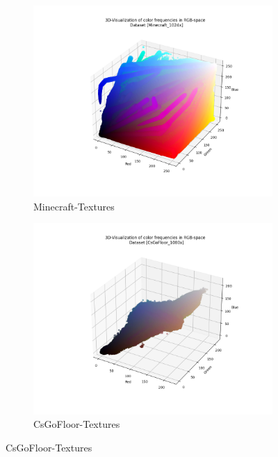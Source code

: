 \begin{figure}[h]
        \begin{subfigure}{.33\textwidth}
          \centering
          \includegraphics[width=\linewidth]{../code/dataAnalysis/output/Minecraft_1024x.png}
          \caption{Minecraft-Textures}
          \label{fig:dataset-Minecraft-Textures}
        \end{subfigure}%
        \hfill
        \begin{subfigure}{.33\textwidth}
          \centering
          \includegraphics[width=\linewidth]{../code/dataAnalysis/output/CsGoFloor_1080x.png}
          \caption{CsGoFloor-Textures}
          \label{fig:dataset-CsGoFloor-Textures}

\end{subfigure}
\end{figure}
